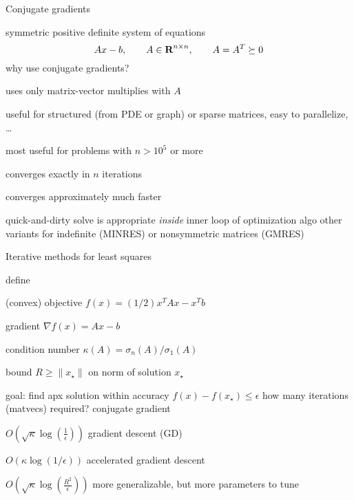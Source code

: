 \documentclass[presentation,xcolor={usenames,dvipsnames}]{beamer}
\begin{document}
\begin{frame}{Conjugate gradients}

symmetric positive definite system of equations
\[
Ax - b, \qquad A\in{\mbox{\bf R}}^{n\times n}, \qquad A = A^T \succeq 0
\]
\pause
why use conjugate gradients?
\bit
\item uses only matrix-vector multiplies with $A$
\bit \item useful for structured (from PDE or graph) or sparse matrices, easy to parallelize, \ldots \eit
\item most useful for problems with $n>10^5$ or more
\item converges exactly in $n$ iterations
\item converges approximately much faster
\item quick-and-dirty solve is appropriate \emph{inside} inner loop of optimization algo
\eit
\pause
other variants for indefinite (MINRES) or nonsymmetric matrices (GMRES)

\end{frame}

\begin{frame}{Iterative methods for least squares}

define
\bit
\item (convex) objective $f(x) = (1/2) x^T Ax - x^T b$
\item gradient $\nabla f(x) = Ax - b$
\item condition number $\kappa(A) = \sigma_n (A) / \sigma_1(A)$
\item bound $R \geq \|x_\star\|$ on norm of solution $x_\star$
\item goal: find apx solution within accuracy $f(x) - f(x_\star) \leq \epsilon$
\eit
\pause
how many iterations (matvecs) required?
  \bit
  \pitem conjugate gradient
  \bit \item $O\left(\sqrt{\kappa}\log(\frac{1}{\epsilon})\right)$ \eit
  \pitem gradient descent (GD)
  \bit \item $O\left(\kappa \log(1/\epsilon)\right)$ \eit
  \pitem accelerated gradient descent
  \bit \item $O\left(\sqrt{\kappa}\log(\frac{R^2}{\epsilon})\right)$ more generalizable, but more parameters to tune \eit
  \eit


\end{frame}
\end{document}
